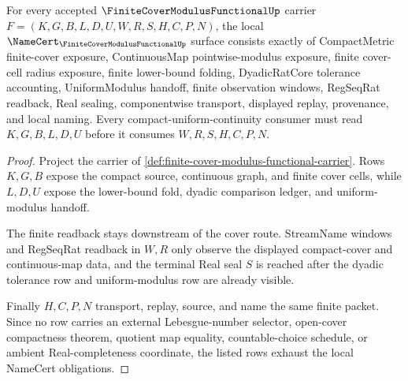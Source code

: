 \begin{theorem}
\label{thm:finite-cover-modulus-functional-namecert-obligations}
For every accepted $\FiniteCoverModulusFunctionalUp$ carrier $F=(K,G,B,L,D,U,W,R,S,H,C,P,N)$, the local $\NameCert_{\FiniteCoverModulusFunctionalUp}$ surface consists exactly of CompactMetric finite-cover exposure, ContinuousMap pointwise-modulus exposure, finite cover-cell radius exposure, finite lower-bound folding, DyadicRatCore tolerance accounting, UniformModulus handoff, finite observation windows, RegSeqRat readback, Real sealing, componentwise transport, displayed replay, provenance, and local naming. Every compact-uniform-continuity consumer must read $K,G,B,L,D,U$ before it consumes $W,R,S,H,C,P,N$.
\end{theorem}
\begin{proof}
Project the carrier of \autoref{def:finite-cover-modulus-functional-carrier}. Rows $K,G,B$ expose the compact source, continuous graph, and finite cover cells, while $L,D,U$ expose the lower-bound fold, dyadic comparison ledger, and uniform-modulus handoff.

The finite readback stays downstream of the cover route. StreamName windows and RegSeqRat readback in $W,R$ only observe the displayed compact-cover and continuous-map data, and the terminal Real seal $S$ is reached after the dyadic tolerance row and uniform-modulus row are already visible.

Finally $H,C,P,N$ transport, replay, source, and name the same finite packet. Since no row carries an external Lebesgue-number selector, open-cover compactness theorem, quotient map equality, countable-choice schedule, or ambient Real-completeness coordinate, the listed rows exhaust the local NameCert obligations.
\end{proof}



